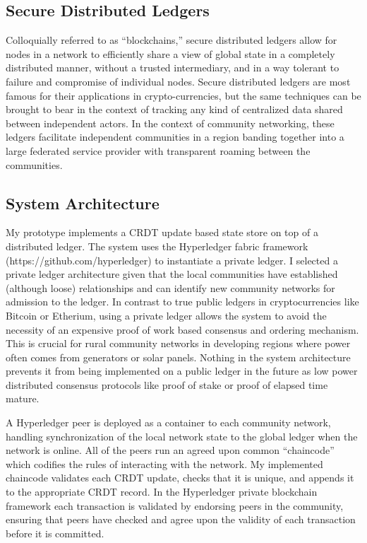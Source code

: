 \subsection{Secure Distributed Ledgers}
Colloquially referred to as ``blockchains,'' secure distributed
ledgers allow for nodes in a network to efficiently share a view of
global state in a completely distributed manner, without a trusted
intermediary, and in a way tolerant to failure and compromise of
individual nodes.\cite{BabuBlockchainTelco2016} Secure distributed
ledgers are most famous for their applications in crypto-currencies,
but the same techniques can be brought to bear in the context of
tracking any kind of centralized data shared between independent
actors. In the context of community networking, these ledgers
facilitate independent communities in a region banding together into a
large federated service provider with transparent roaming between the
communities.

\subsection{System Architecture}
My prototype implements a CRDT update based state store on top of a
distributed ledger. The system uses the Hyperledger fabric framework
(https://github.com/hyperledger) to instantiate a private ledger. I
selected a private ledger architecture given that the local
communities have established (although loose) relationships and can
identify new community networks for admission to the ledger. In
contrast to true public ledgers in cryptocurrencies like Bitcoin or
Etherium, using a private ledger allows the system to avoid the
necessity of an expensive proof of work based consensus and ordering
mechanism. This is crucial for rural community networks in developing
regions where power often comes from generators or solar
panels. Nothing in the system architecture prevents it from being
implemented on a public ledger in the future as low power distributed
consensus protocols like proof of stake or proof of elapsed time
mature.

A Hyperledger peer is deployed as a container to each community
network, handling synchronization of the local network state to the
global ledger when the network is online. All of the peers run an
agreed upon common ``chaincode'' which codifies the rules of
interacting with the network. My implemented chaincode validates each
CRDT update, checks that it is unique, and appends it to the
appropriate CRDT record. In the Hyperledger private blockchain
framework each transaction is validated by endorsing peers in the
community, ensuring that peers have checked and agree upon the
validity of each transaction before it is committed.

